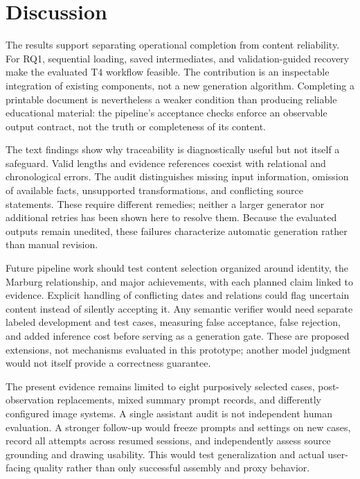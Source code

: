 \documentclass[11pt]{article}
\begin{document}
\section{Discussion}
\label{sec:discussion}

The results support separating operational completion from content reliability. For RQ1, sequential loading, saved intermediates, and validation-guided recovery make the evaluated T4 workflow feasible. The contribution is an inspectable integration of existing components, not a new generation algorithm. Completing a printable document is nevertheless a weaker condition than producing reliable educational material: the pipeline's acceptance checks enforce an observable output contract, not the truth or completeness of its content.

The text findings show why traceability is diagnostically useful but not itself a safeguard. Valid lengths and evidence references coexist with relational and chronological errors. The audit distinguishes missing input information, omission of available facts, unsupported transformations, and conflicting source statements. These require different remedies; neither a larger generator nor additional retries has been shown here to resolve them. Because the evaluated outputs remain unedited, these failures characterize automatic generation rather than manual revision.

Future pipeline work should test content selection organized around identity, the Marburg relationship, and major achievements, with each planned claim linked to evidence. Explicit handling of conflicting dates and relations could flag uncertain content instead of silently accepting it. Any semantic verifier would need separate labeled development and test cases, measuring false acceptance, false rejection, and added inference cost before serving as a generation gate. These are proposed extensions, not mechanisms evaluated in this prototype; another model judgment would not itself provide a correctness guarantee.

The present evidence remains limited to eight purposively selected cases, post-observation replacements, mixed summary prompt records, and differently configured image systems. A single assistant audit is not independent human evaluation. A stronger follow-up would freeze prompts and settings on new cases, record all attempts across resumed sessions, and independently assess source grounding and drawing usability. This would test generalization and actual user-facing quality rather than only successful assembly and proxy behavior.
\end{document}
